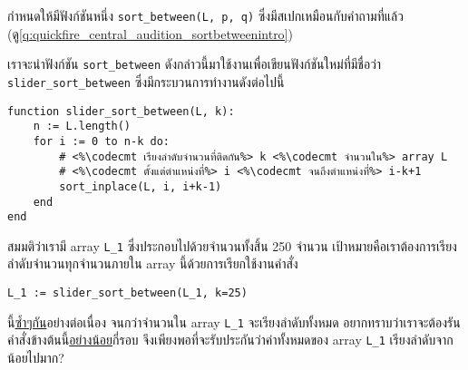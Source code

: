 \question{}

กำหนดให้มีฟังก์ชันหนึ่ง \lstinline{sort_between(L, p, q)} 
ซึ่งมีสเปกเหมือนกับคำถามที่แล้ว (ดู\autoref{q:quickfire_central_audition_sortbetweenintro})

เราจะนำฟังก์ชัน \lstinline{sort_between} ดังกล่าวนี้มาใช้งานเพื่อเขียนฟังก์ชันใหม่ที่มีชื่อว่า
\lstinline{slider_sort_between} ซึ่งมีกระบวนการทำงานดังต่อไปนี้
\begin{lstlisting}
function slider_sort_between(L, k):
    n := L.length()
    for i := 0 to n-k do:
        # <%\codecmt เรียงลำดับจำนวนที่ติดกัน%> k <%\codecmt จำนวนใน%> array L
        # <%\codecmt ตั้งแต่ตำแหน่งที่%> i <%\codecmt จนถึงตำแหน่งที่%> i-k+1
        sort_inplace(L, i, i+k-1)
    end
end
\end{lstlisting}

สมมติว่าเรามี array \lstinline{L_1} ซึ่งประกอบไปด้วยจำนวนทั้งสิ้น 250 จำนวน\;
เป้าหมายคือเราต้องการเรียงลำดับจำนวนทุกจำนวนภายใน array นี้ด้วยการเรียกใช้งานคำสั่ง
\begin{center}
    \lstinline{L_1 := slider_sort_between(L_1, k=25)}
\end{center}
นี้\uline{ซ้ำ\;ๆ\;กัน}อย่างต่อเนื่อง จนกว่าจำนวนใน array \lstinline{L_1} จะเรียงลำดับทั้งหมด\;
อยากทราบว่าเราจะต้องรันคำสั่งข้างต้นนี้\uline{อย่างน้อย}กี่รอบ
จึงเพียงพอที่จะรับประกันว่าค่าทั้งหมดของ array \lstinline{L_1} เรียงลำดับจากน้อยไปมาก?
